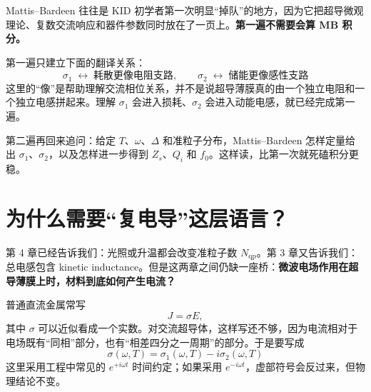 \documentclass[11pt,a4paper,openany]{ctexrep}
\newcommand{\qp}{\mathrm{qp}}
\begin{document}
\begin{tcolorbox}[colback=KidGold!9,colframe=KidGold!75!black,boxrule=0.7pt,arc=2mm,title=这一章建议读两遍：第一遍只抓住 $\sigma_1$ 和 $\sigma_2$,fonttitle=\bfseries]
Mattis--Bardeen 往往是 KID 初学者第一次明显“掉队”的地方，因为它把超导微观理论、复数交流响应和器件参数同时放在了一页上。\textbf{第一遍不需要会算 MB 积分。}

第一遍只建立下面的翻译关系：
\[
\boxed{
\sigma_1\;\longleftrightarrow\;\text{耗散更像电阻支路},
\qquad
\sigma_2\;\longleftrightarrow\;\text{储能更像感性支路}
}
\]
这里的“像”是帮助理解交流相位关系，并不是说超导薄膜真的由一个独立电阻和一个独立电感拼起来。理解 $\sigma_1$ 会进入损耗、$\sigma_2$ 会进入动能电感，就已经完成第一遍。

第二遍再回来追问：给定 $T$、$\omega$、$\Delta$ 和准粒子分布，Mattis--Bardeen 怎样定量给出 $\sigma_1$、$\sigma_2$，以及怎样进一步得到 $Z_s$、$Q_i$ 和 $f_0$。这样读，比第一次就死磕积分更稳。
\end{tcolorbox}

\section{为什么需要“复电导”这层语言？}

第 4 章已经告诉我们：光照或升温都会改变准粒子数 $N_{\qp}$。第 3 章又告诉我们：总电感包含 kinetic inductance。但是这两章之间仍缺一座桥：\textbf{微波电场作用在超导薄膜上时，材料到底如何产生电流？}

普通直流金属常写
\[
J=\sigma E,
\]
其中 $\sigma$ 可以近似看成一个实数。对交流超导体，这样写还不够，因为电流相对于电场既有“同相”部分，也有“相差四分之一周期”的部分。于是要写成
\[
\boxed{
\sigma(\omega,T)=\sigma_1(\omega,T)-i\sigma_2(\omega,T)
}
\]
这里采用工程中常见的 $e^{+i\omega t}$ 时间约定；如果采用 $e^{-i\omega t}$，虚部符号会反过来，但物理结论不变。

\begin{center}
\end{center}
\end{document}
